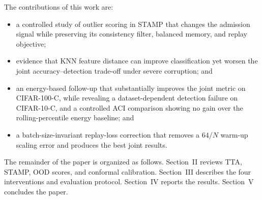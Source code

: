 The contributions of this work are:
\begin{itemize}
    \item a controlled study of outlier scoring in STAMP that changes the
    admission signal while preserving its consistency filter, balanced memory,
    and replay objective;
    \item evidence that KNN feature distance can improve classification yet
    worsen the joint accuracy--detection trade-off under severe corruption; and
    \item an energy-based follow-up that substantially improves the joint
    metric on CIFAR-100-C, while revealing a dataset-dependent detection
    failure on CIFAR-10-C, and a controlled ACI comparison showing no gain over
    the rolling-percentile energy baseline; and
    \item a batch-size-invariant replay-loss correction that removes a $64/N$
    warm-up scaling error and produces the best joint results.
\end{itemize}

The remainder of the paper is organized as follows. Section~II reviews TTA,
STAMP, OOD scores, and conformal calibration. Section~III describes the four
interventions and evaluation protocol. Section~IV reports the results.
Section~V concludes the paper.

